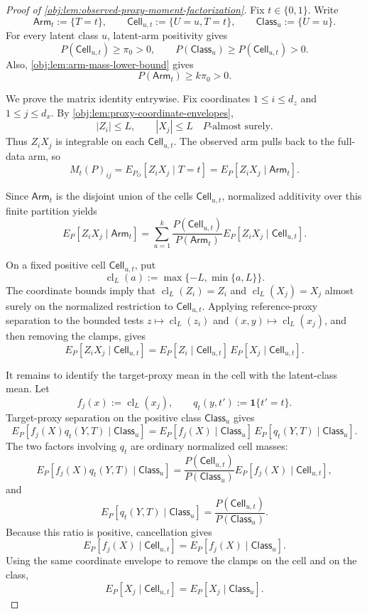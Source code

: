 \begin{proof}[Proof of \cref{obj:lem:observed-proxy-moment-factorization}]
Fix \(t\in\{0,1\}\).  Write
\[
\mathsf{Arm}_t:=\{T=t\},\qquad
\mathsf{Cell}_{u,t}:=\{U=u,T=t\},\qquad
\mathsf{Class}_u:=\{U=u\}.
\]
For every latent class \(u\), latent-arm positivity gives
\[
P(\mathsf{Cell}_{u,t})\ge \pi_0>0,
\qquad
P(\mathsf{Class}_u)\ge P(\mathsf{Cell}_{u,t})>0.
\]
Also, \cref{obj:lem:arm-mass-lower-bound} gives
\[
P(\mathsf{Arm}_t)\ge k\pi_0>0 .
\]

We prove the matrix identity entrywise.  Fix coordinates \(1\le i\le d_z\) and \(1\le j\le d_x\).  By \cref{obj:lem:proxy-coordinate-envelopes},
\[
|Z_i|\le L,\qquad |X_j|\le L
\quad\text{\(P\)-almost surely.}
\]
Thus \(Z_iX_j\) is integrable on each \(\mathsf{Cell}_{u,t}\).  The observed arm pulls back to the full-data arm, so
\[
M_t(P)_{ij}
=
E_{P_O}[Z_iX_j\mid T=t]
=
E_P[Z_iX_j\mid \mathsf{Arm}_t].
\]

Since \(\mathsf{Arm}_t\) is the disjoint union of the cells
\(\mathsf{Cell}_{u,t}\), normalized additivity over this finite partition yields
\[
E_P[Z_iX_j\mid \mathsf{Arm}_t]
=
\sum_{u=1}^{k}
\frac{P(\mathsf{Cell}_{u,t})}{P(\mathsf{Arm}_t)}
E_P[Z_iX_j\mid \mathsf{Cell}_{u,t}].
\]

On a fixed positive cell \(\mathsf{Cell}_{u,t}\), put
\[
\operatorname{cl}_L(a):=\max\{-L,\min\{a,L\}\}.
\]
The coordinate bounds imply that \(\operatorname{cl}_L(Z_i)=Z_i\) and
\(\operatorname{cl}_L(X_j)=X_j\) almost surely on the normalized restriction to
\(\mathsf{Cell}_{u,t}\).  Applying reference-proxy separation to the bounded
tests \(z\mapsto \operatorname{cl}_L(z_i)\) and
\((x,y)\mapsto \operatorname{cl}_L(x_j)\), and then removing the clamps, gives
\[
E_P[Z_iX_j\mid \mathsf{Cell}_{u,t}]
=
E_P[Z_i\mid \mathsf{Cell}_{u,t}]\,
E_P[X_j\mid \mathsf{Cell}_{u,t}].
\]

It remains to identify the target-proxy mean in the cell with the latent-class
mean.  Let
\[
f_j(x):=\operatorname{cl}_L(x_j),
\qquad
q_t(y,t'):=\mathbf 1\{t'=t\}.
\]
Target-proxy separation on the positive class \(\mathsf{Class}_u\) gives
\[
E_P[f_j(X)q_t(Y,T)\mid \mathsf{Class}_u]
=
E_P[f_j(X)\mid \mathsf{Class}_u]\,
E_P[q_t(Y,T)\mid \mathsf{Class}_u].
\]
The two factors involving \(q_t\) are ordinary normalized cell masses:
\[
E_P[f_j(X)q_t(Y,T)\mid \mathsf{Class}_u]
=
\frac{P(\mathsf{Cell}_{u,t})}{P(\mathsf{Class}_u)}
E_P[f_j(X)\mid \mathsf{Cell}_{u,t}],
\]
and
\[
E_P[q_t(Y,T)\mid \mathsf{Class}_u]
=
\frac{P(\mathsf{Cell}_{u,t})}{P(\mathsf{Class}_u)}.
\]
Because this ratio is positive, cancellation gives
\[
E_P[f_j(X)\mid \mathsf{Cell}_{u,t}]
=
E_P[f_j(X)\mid \mathsf{Class}_u].
\]
Using the same coordinate envelope to remove the clamps on the cell and on the
class,
\[
E_P[X_j\mid \mathsf{Cell}_{u,t}]
=
E_P[X_j\mid \mathsf{Class}_u].
\]


\end{proof}
